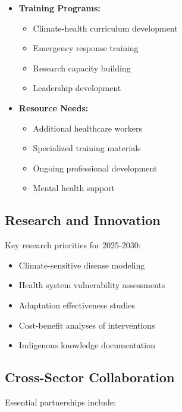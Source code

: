 \begin{itemize}
    \item \textbf{Training Programs:}
    \begin{itemize}
        \item Climate-health curriculum development
        \item Emergency response training
        \item Research capacity building
        \item Leadership development
    \end{itemize}
    
    \item \textbf{Resource Needs:}
    \begin{itemize}
        \item Additional healthcare workers
        \item Specialized training materials
        \item Ongoing professional development
        \item Mental health support
    \end{itemize}
\end{itemize}

\subsection{Research and Innovation}
Key research priorities for 2025-2030:

\begin{itemize}
    \item Climate-sensitive disease modeling
    \item Health system vulnerability assessments
    \item Adaptation effectiveness studies
    \item Cost-benefit analyses of interventions
    \item Indigenous knowledge documentation
\end{itemize}

\subsection{Cross-Sector Collaboration}
Essential partnerships include:

